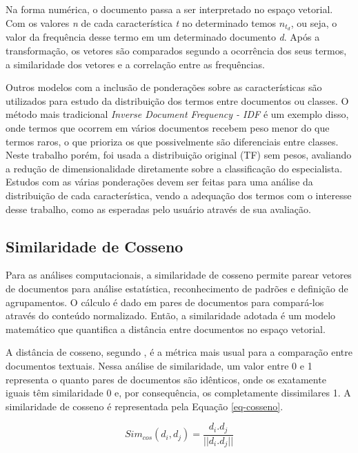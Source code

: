 Na forma numérica, o documento passa a ser interpretado no espaço vetorial. Com os valores \textit{n} de cada característica \textit{t} no determinado temos $ n_{t_{d}}$, ou seja, o valor da frequência desse termo em um determinado documento \textit{d}. Após a transformação, os vetores são comparados segundo a ocorrência dos seus termos, a similaridade dos vetores e a correlação entre as frequências.

Outros modelos com a inclusão de ponderações sobre as características são utilizados para estudo da distribuição dos termos entre documentos ou classes. O método mais tradicional \textit{Inverse Document Frequency - IDF} \cite{baeza2011} é um exemplo disso, onde termos que ocorrem em vários documentos recebem peso menor do que termos raros, o que prioriza os que possivelmente são diferenciais entre classes. Neste trabalho porém, foi usada a distribuição original (TF) sem pesos, avaliando a redução de dimensionalidade diretamente sobre a classificação do especialista. Estudos com as várias ponderações devem ser feitas para uma análise da distribuição de cada característica, vendo a adequação dos termos com o interesse desse trabalho, como as esperadas pelo usuário através de sua avaliação.

\subsection{Similaridade de Cosseno} \label{similaridade}
Para as análises computacionais, a similaridade de cosseno permite parear vetores de documentos para análise estatística, reconhecimento de padrões e definição de agrupamentos. O cálculo é dado em pares de documentos para compará-los através do conteúdo normalizado. Então, a similaridade adotada é um modelo matemático que quantifica a distância entre documentos no espaço vetorial.

A distância de cosseno, segundo \cite{baeza2011}, é a métrica mais usual para a comparação entre documentos textuais. Nessa análise de similaridade, um valor entre 0 e 1 representa o quanto pares de documentos são idênticos, onde os exatamente iguais têm similaridade 0 e, por consequência, os completamente dissimilares 1. A similaridade de cosseno é representada pela Equação \ref{eq-cosseno}.

\begin{equation}
Sim_{cos}(d_{i},d_{j}) = \frac{d_{i}.d_{j}}{||d_{i}.d_{j}||}
\label{eq-cosseno}
\end{equation}

